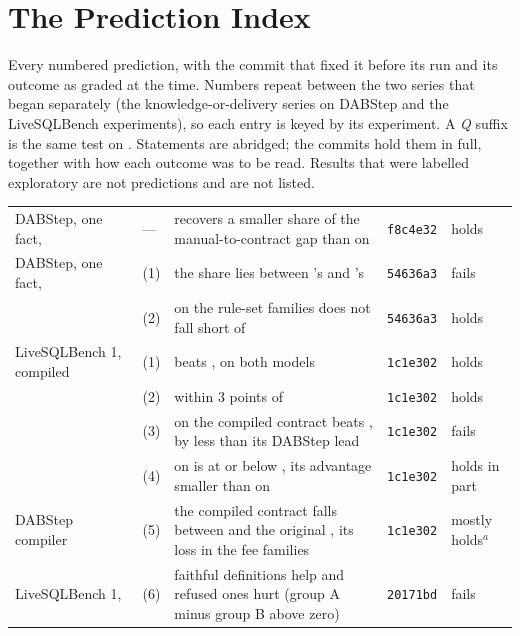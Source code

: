 \section{The Prediction Index}
\label{app:predictions}

Every numbered prediction, with the commit that fixed it before its run and
its outcome as graded at the time. Numbers repeat between the two series
that began separately (the knowledge-or-delivery series on DABStep and the
LiveSQLBench experiments), so each entry is keyed by its experiment. A
\emph{Q} suffix is the same test on \mQwen{}. Statements are abridged; the
commits hold them in full, together with how each outcome was to be read.
Results that were labelled exploratory are not predictions and are not
listed.

\begin{table}[t]
\centering
\scriptsize
\setlength{\tabcolsep}{3pt}
\renewcommand{\arraystretch}{0.95}
\begin{tabular}{@{}L{2.7cm}L{1.5cm}L{9.0cm}ll@{}}
\toprule
{} &  &  &  &  \\
\midrule
DABStep, one fact, \mQwen{} & --- & \armMw{} recovers a smaller share of the manual-to-contract gap than on \mSol{} & \texttt{f8c4e32} & holds \\
DABStep, one fact, \mLuna{} & (1) & the share lies between \mQwen{}'s and \mSol{}'s & \texttt{54636a3} & fails \\
 & (2) & on the rule-set families \armC{} does not fall short of \armMw{} & \texttt{54636a3} & holds \\
\midrule
LiveSQLBench 1, compiled & (1) & \armM{} beats \armS{}, on both models & \texttt{1c1e302} & holds \\
 & (2) & \armMsql{} within 3 points of \armM{} & \texttt{1c1e302} & holds \\
 & (3) & on \mLuna{} the compiled contract beats \armMsql{}, by less than its DABStep lead & \texttt{1c1e302} & fails \\
 & (4) & on \mQwen{} \armComp{} is at or below \armMsql{}, its advantage smaller than on \mLuna{} & \texttt{1c1e302} & holds in part \\
DABStep compiler & (5) & the compiled contract falls between \armM{} and the original \armC{}, its loss in the fee families & \texttt{1c1e302} & mostly holds$^a$ \\
LiveSQLBench 1, \mQwen{} & (6) & faithful definitions help and refused ones hurt (group A minus group B above zero) & \texttt{20171bd} & fails \\

\end{tabular}
\end{table}
